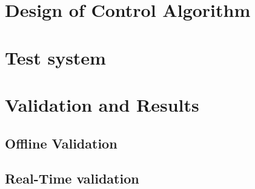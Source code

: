 \section{Design of Control Algorithm}\label{sec:design}


\section{Test system}


\section{Validation and Results}\label{sec:val}

\subsection{Offline Validation}
\subsection{Real-Time validation}